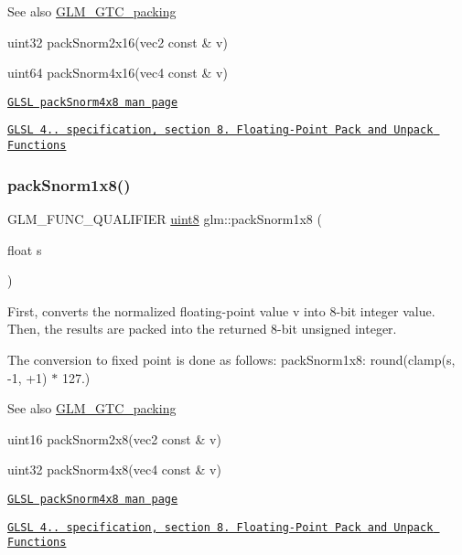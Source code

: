 \begin{DoxySeeAlso}{See also}
\hyperlink{group__gtc__packing}{G\+L\+M\+\_\+\+G\+T\+C\+\_\+packing} 

uint32 pack\+Snorm2x16(vec2 const \& v) 

uint64 pack\+Snorm4x16(vec4 const \& v) 

\href{http://www.opengl.org/sdk/docs/manglsl/xhtml/packSnorm4x8.xml}{\tt G\+L\+SL pack\+Snorm4x8 man page} 

\href{http://www.opengl.org/registry/doc/GLSLangSpec.4.20.8.pdf}{\tt G\+L\+SL 4.. specification, section 8. Floating-\/\+Point Pack and Unpack Functions} 
\end{DoxySeeAlso}
\mbox{\label{group__gtc__packing_ga26b6cd7a35c46c4b6a342f3b97b47423}} 
\subsubsection{\texorpdfstring{pack\+Snorm1x8()}{packSnorm1x8()}}
{\footnotesize\ttfamily G\+L\+M\+\_\+\+F\+U\+N\+C\+\_\+\+Q\+U\+A\+L\+I\+F\+I\+ER \hyperlink{group__gtc__type__precision_ga1a7dcd8aac97cc8020817c94049deff2}{uint8} glm\+::pack\+Snorm1x8 (\begin{DoxyParamCaption}\item[{float}]{s }\end{DoxyParamCaption})}

First, converts the normalized floating-\/point value v into 8-\/bit integer value. Then, the results are packed into the returned 8-\/bit unsigned integer.

The conversion to fixed point is done as follows\+: pack\+Snorm1x8\+: round(clamp(s, -\/1, +1) $\ast$ 127.)

\begin{DoxySeeAlso}{See also}
\hyperlink{group__gtc__packing}{G\+L\+M\+\_\+\+G\+T\+C\+\_\+packing} 

uint16 pack\+Snorm2x8(vec2 const \& v) 

uint32 pack\+Snorm4x8(vec4 const \& v) 

\href{http://www.opengl.org/sdk/docs/manglsl/xhtml/packSnorm4x8.xml}{\tt G\+L\+SL pack\+Snorm4x8 man page} 

\href{http://www.opengl.org/registry/doc/GLSLangSpec.4.20.8.pdf}{\tt G\+L\+SL 4.. specification, section 8. Floating-\/\+Point Pack and Unpack Functions} 
\end{DoxySeeAlso}
\mbox{\label{group__gtc__packing_ga05d08a82923166ec7cd5d0e6154c9953}} 
